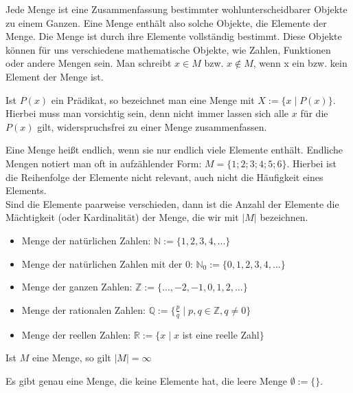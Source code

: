 \begin{overview}[Mengenlehre]
	Jede Menge ist eine Zusammenfassung bestimmter wohlunterscheidbarer Objekte zu einem Ganzen. Eine
	Menge enthält also solche Objekte, die Elemente der Menge. Die Menge ist durch ihre Elemente
	vollständig bestimmt. Diese Objekte können für uns verschiedene mathematische Objekte, wie
	Zahlen, Funktionen oder andere Mengen sein. Man schreibt $x \in M$ bzw. $x \notin M$, wenn x ein
	bzw. kein Element der Menge ist.
	
	Ist $P(x)$ ein Prädikat, so bezeichnet man eine Menge mit $X := \{x \mid P(x)\}$. Hierbei muss
	man vorsichtig sein, denn nicht immer lassen sich alle $x$ für die $P(x)$ gilt, widerspruchsfrei
	zu einer Menge zusammenfassen.
\end{overview}

\begin{example}
	Eine Menge heißt endlich, wenn sie nur endlich viele Elemente enthält. Endliche Mengen
	notiert man oft in aufzählender Form: $M = \{1;2;3;4;5;6\}$. Hierbei ist die Reihenfolge
	der Elemente nicht relevant, auch nicht die Häufigkeit eines Elements. \\
	Sind die Elemente paarweise verschieden, dann ist die Anzahl der Elemente die Mächtigkeit
	(oder Kardinalität) der Menge, die wir mit $|M|$ bezeichnen.
\end{example}

\begin{example}
	\begin{itemize}
		\item Menge der natürlichen Zahlen: $\mathbb N := \{1,2,3,4,...\}$
		\item Menge der natürlichen Zahlen mit der 0: $\mathbb N_0 := \{0,1,2,3,4,...\}$
		\item Menge der ganzen Zahlen: $\mathbb Z := \{...,-2,-1,0,1,2,...\}$
		\item Menge der rationalen Zahlen: $\mathbb Q := \{\frac p q \mid p,q \in \mathbb Z, q 
		\neq 0\}$
		\item Menge der reellen Zahlen: $\mathbb R := \{x \mid x$ ist eine reelle Zahl$\}$
	\end{itemize}
	Ist $M$ eine Menge, so gilt $|M|=\infty$
\end{example}

\begin{example}
	Es gibt genau eine Menge, die keine Elemente hat, die leere Menge $\emptyset := \{\}$.
\end{example}


